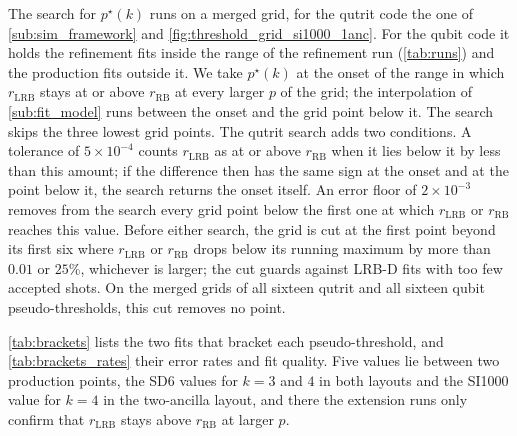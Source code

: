 The search for $p^\star(k)$ runs on a merged grid, for the qutrit code the one of \autoref{sub:sim_framework} and \autoref{fig:threshold_grid_si1000_1anc}. For the qubit code it holds the refinement fits inside the range of the refinement run (\autoref{tab:runs}) and the production fits outside it. We take $p^\star(k)$ at the onset of the range in which $r_{\mathrm{LRB}}$ stays at or above $r_{\mathrm{RB}}$ at every larger $p$ of the grid; the interpolation of \autoref{sub:fit_model} runs between the onset and the grid point below it. The search skips the three lowest grid points. The qutrit search adds two conditions. A tolerance of $5\times10^{-4}$ counts $r_{\mathrm{LRB}}$ as at or above $r_{\mathrm{RB}}$ when it lies below it by less than this amount; if the difference then has the same sign at the onset and at the point below it, the search returns the onset itself. An error floor of $2\times10^{-3}$ removes from the search every grid point below the first one at which $r_{\mathrm{LRB}}$ or $r_{\mathrm{RB}}$ reaches this value. Before either search, the grid is cut at the first point beyond its first six where $r_{\mathrm{LRB}}$ or $r_{\mathrm{RB}}$ drops below its running maximum by more than $0.01$ or $25\%$, whichever is larger; the cut guards against LRB-D fits with too few accepted shots. On the merged grids of all sixteen qutrit and all sixteen qubit pseudo-thresholds, this cut removes no point.

\autoref{tab:brackets} lists the two fits that bracket each pseudo-threshold, and \autoref{tab:brackets_rates} their error rates and fit quality. Five values lie between two production points, the SD6 values for $k = 3$ and $4$ in both layouts and the SI1000 value for $k = 4$ in the two-ancilla layout, and there the extension runs only confirm that $r_{\mathrm{LRB}}$ stays above $r_{\mathrm{RB}}$ at larger $p$.

